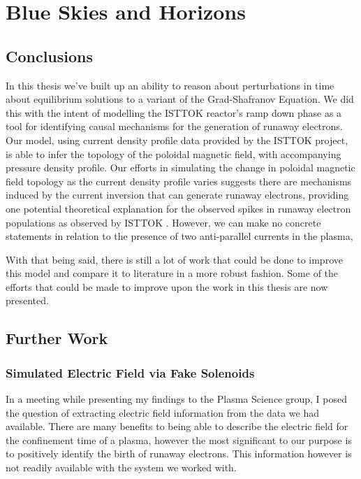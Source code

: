 
\chapter{Blue Skies and Horizons}
\label{chapter6}

\section{Conclusions}

In this thesis we've built up an ability to reason about perturbations in time about 
equilibrium solutions to a variant of the Grad-Shafranov Equation. We did this with the intent 
of modelling the ISTTOK reactor's ramp down phase as a tool for identifying 
causal mechanisms for the generation of runaway electrons. Our model, using current 
density profile data provided by the ISTTOK project, is able to infer the topology 
of the poloidal magnetic field, with accompanying pressure density profile. Our 
efforts in simulating the change in poloidal magnetic field topology as the current 
density profile varies suggests there are mechanisms induced by the current inversion 
that can generate runaway electrons, providing one potential theoretical explanation 
for the observed spikes in runaway electron populations as observed by ISTTOK \cite{malaquias-matthew}.
However, we can make no concrete statements in relation to the presence of two anti-parallel 
currents in the plasma, 

With that being said, there is still a lot of work that could be done to improve this 
model and compare it to literature in a more robust fashion. Some of the efforts that 
could be made to improve upon the work in this thesis are now presented.

\section{Further Work}

\subsection{Simulated Electric Field via Fake Solenoids}

In a meeting while presenting my findings to the Plasma Science group, I 
posed the question of extracting electric field information from the data 
we had available. There are many benefits to being able to describe the 
electric field for the confinement time of a plasma, however the 
most significant to our purpose is to positively identify the 
birth of runaway electrons. This information however is not readily 
available with the system we worked with.

